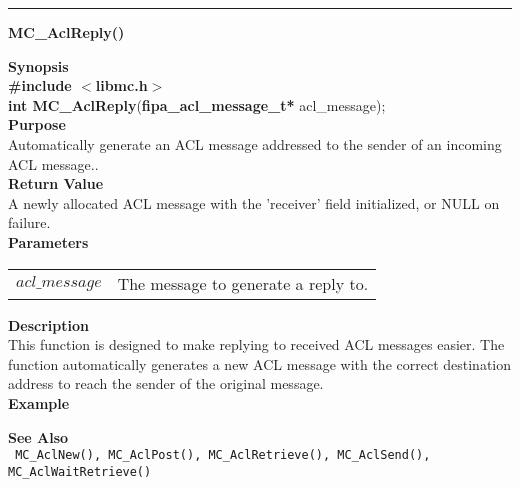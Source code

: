 \noindent
\vspace{5pt}
\rule{6.5in}{0.015in}
\noindent
{}
{\LARGE \bf MC\_AclReply()}\\
\label{api:MC_AclReply()}

\noindent
{\bf Synopsis}\\
{\bf \#include $<$libmc.h$>$}\\
{\bf int MC\_AclReply}({\bf fipa\_acl\_message\_t*} acl\_message);\\

\noindent
{\bf Purpose}\\
Automatically generate an ACL message addressed to the sender of an
incoming ACL message..\\

\noindent
{\bf Return Value}\\
A newly allocated ACL message with the 'receiver' field initialized, or
NULL on failure.\\

\noindent
{\bf Parameters}
\vspace{-0.1in}
\begin{description}
\item
\begin{tabular}{p{10 mm}p{145 mm}} 
$acl\_message$ & The message to generate a reply to.
\end{tabular}
\end{description}

\noindent
{\bf Description}\\
This function is designed to make replying to received ACL messages easier.
The function automatically generates a new ACL message with the correct
destination address to reach the sender of the original message.\\

\noindent
{\bf Example}\\
\noindent

\noindent
{\bf See Also}\\
\texttt{
  MC\_AclNew(), MC\_AclPost(), MC\_AclRetrieve(), MC\_AclSend(), \linebreak 
    MC\_AclWaitRetrieve()
}

